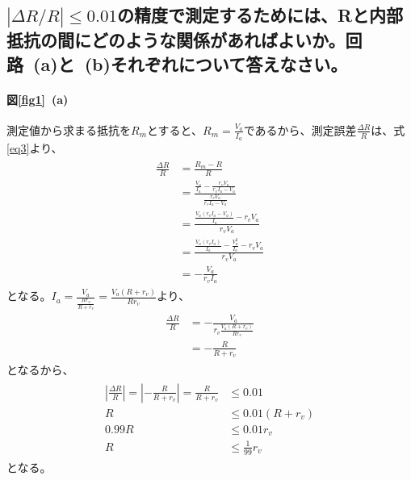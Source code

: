 \documentclass[a4paper,11pt]{jsarticle}
\begin{document}
\subsection{$\left|\Delta R/R\right|\leq 0.01$の精度で測定するためには、Rと内部抵抗の間にどのような関係があればよいか。回路~(a)と~(b)それぞれについて答えなさい。}

\paragraph{図\ref{fig1}~(a)}
測定値から求まる抵抗を$R_{m}$とすると、$R_{m}=\frac{V_{a}}{I_{a}}$であるから、測定誤差$\frac{\Delta R}{R}$は、式\eqref{eq3}より、
\begin{align}
  \begin{split}
    \frac{\Delta R}{R}
    &=\frac{R_{m}-R}{R}\\
    &=\frac{\frac{V_{a}}{I_{a}}-\frac{r_{v}V_{a}}{r_{v}I_{a}-V_{a}}}{\frac{r_{v}V_{a}}{r_{v}I_{a}-V_{a}}}\\
    &=\frac{\frac{V_{a}(r_{v}I_{a}-V_{a})}{I_{a}}-r_{v}V_{a}}{r_{v}V_{a}}\\
    &=\frac{\frac{V_{a}(r_{v}I_{a})}{I_{a}}-\frac{V_{a}^{2}}{I_{a}}-r_{v}V_{a}}{r_{v}V_{a}}\\
    &=-\frac{V_{a}}{r_{v}I_{a}}
    \label{eq5}
  \end{split}
\end{align}
となる。$I_{a}=\frac{V_{a}}{\frac{Rr_{v}}{R+r_{v}}}=\frac{V_{a}(R+r_{v})}{Rr_{v}}$より、
\begin{align}
  \begin{split}
    \frac{\Delta R}{R}
    &=-\frac{V_{a}}{r_{v}\frac{V_{a}(R+r_{v})}{Rr_{v}}}\\
    &=-\frac{R}{R+r_{v}}
    \label{eq6}
  \end{split}
\end{align}
となるから、
\begin{align}
  \begin{split}
    \left|\frac{\Delta R}{R}\right|=\left|-\frac{R}{R+r_{v}}\right|=\frac{R}{R+r_{v}}
    &\leq 0.01\\
    R
    &\leq 0.01(R+r_{v})\\
    0.99R
    &\leq 0.01r_{v}\\
    R
    &\leq \frac{1}{99}r_{v}
    \label{eq7}
  \end{split}
\end{align}
となる。
\end{document}
